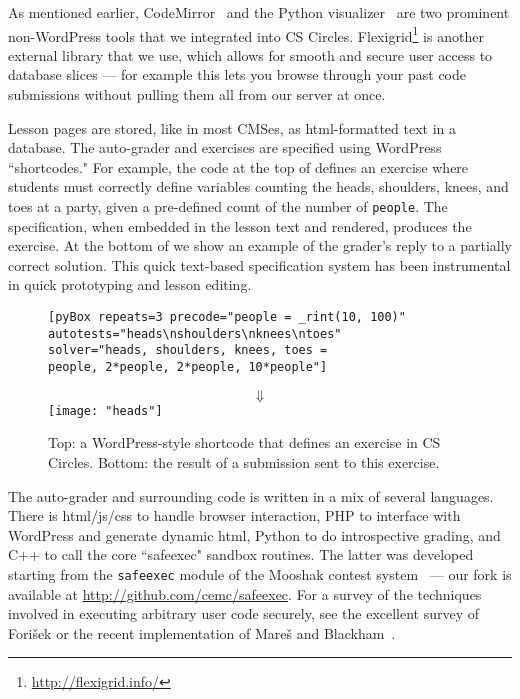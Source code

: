 \documentclass{article}
\begin{document}
{As mentioned earlier, CodeMirror~\cite{Haverbeke1x} and the Python visualizer~\cite{Guo11} are two prominent non-WordPress tools that we integrated into CS Circles. Flexigrid\footnote{\url{http://flexigrid.info/}} is another external library that we use, which allows for smooth and secure user access to database slices --- for example this lets you browse through your past code submissions without pulling them all from our server at once.

Lesson pages are stored, like in most CMSes, as html-formatted text in a database. The auto-grader and exercises are specified using WordPress ``shortcodes." For example, the code at the top of  defines an exercise where students must correctly define variables counting the heads, shoulders, knees, and toes at a party, given a pre-defined count of the number of {\tt people}.
The specification, when embedded in the lesson text and rendered, produces the exercise. At the bottom of  we show an example of the grader's reply to a partially correct solution. This quick text-based specification system has been instrumental in quick prototyping and lesson editing.

\begin{figure}
\centering
\begin{minipage}{10cm}
\begin{verbatim}
[pyBox repeats=3 precode="people = _rint(10, 100)"
autotests="heads\nshoulders\nknees\ntoes"
solver="heads, shoulders, knees, toes =
people, 2*people, 2*people, 10*people"]
\end{verbatim}
\end{minipage}
\vspace{0em}$$\Downarrow$$
\texttt{[image: "heads"]} \caption{Top: a WordPress-style shortcode that defines an exercise in CS Circles. Bottom: the result of a submission sent to this exercise.}\label{fig:heads}
\end{figure}


The auto-grader and surrounding code is written in a mix of several languages. There is html/js/css to handle browser interaction, PHP to interface with WordPress and generate dynamic html, Python to do introspective grading, and C++ to call the core ``safeexec" sandbox routines. The latter was developed starting from the {\tt safeexec} module of the Mooshak contest system~\cite{LS03} --- our fork is available at \url{http://github.com/cemc/safeexec}. For a survey of the techniques involved in executing arbitrary user code securely, see the excellent survey of Fori{\v s}ek \cite{Forisek06} or the recent implementation of Mare{\v s} and Blackham~\cite{MB12}.

}
\end{document}
